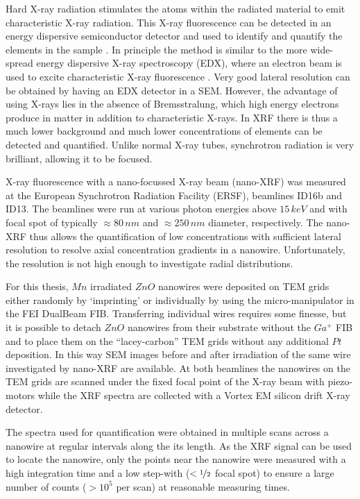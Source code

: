 Hard X-ray radiation stimulates the atoms within the radiated material to emit characteristic X-ray radiation. This X-ray fluorescence can be detected in an energy dispersive semiconductor detector and used to identify and quantify the elements in the sample \cite{glocker_quantitative_1928}. In principle the method is similar to the more wide-spread energy dispersive X-ray spectroscopy (EDX), where an electron beam is used to excite characteristic X-ray fluorescence \cite{jansen_elemental_1982}. Very good lateral resolution can be obtained by having an EDX detector in a SEM. However, the advantage of using X-rays lies in the absence of Bremsstralung, which high energy electrons produce in matter in addition to characteristic X-rays. In XRF there is thus a much lower background and much lower concentrations of elements can be detected and quantified. Unlike normal X-ray tubes, synchrotron radiation is very brilliant, allowing it to be focused. 

X-ray fluorescence with a nano-focussed X-ray beam (nano-XRF) was measured at the European Synchrotron Radiation Facility (ERSF), beamlines ID16b and ID13. The beamlines were run at various photon energies above $15\,keV$ and with focal spot of typically $\approx 80\,nm$ and $\approx 250\,nm$ diameter, respectively. The nano-XRF thus allows the quantification of low concentrations with sufficient lateral resolution to resolve axial concentration gradients in a nanowire. Unfortunately, the resolution is not high enough to investigate radial distributions. 

For this thesis, $Mn$ irradiated $ZnO$ nanowires were deposited on TEM grids either randomly by `imprinting' or individually by using the micro-manipulator in the FEI DualBeam FIB. Transferring individual wires requires some finesse, but it is possible to detach $ZnO$ nanowires from their substrate without the $Ga^+$ FIB and to place them on the ``lacey-carbon'' TEM grids without any additional $Pt$ deposition. In this way SEM images before and after irradiation of the same wire investigated by nano-XRF are available. At both beamlines the nanowires on the TEM grids are scanned under the fixed focal point of the X-ray beam with piezo-motors while the XRF spectra are collected with a Vortex EM silicon drift X-ray detector.

The spectra used for quantification were obtained in multiple scans across a nanowire at regular intervals along the its length. As the XRF signal can be used to locate the nanowire, only the points near the nanowire were measured with a high integration time and a low step-with ($< \nicefrac{1}{2}$ focal spot) to ensure a large number of counts ($> 10^5$ per scan) at reasonable measuring times.



